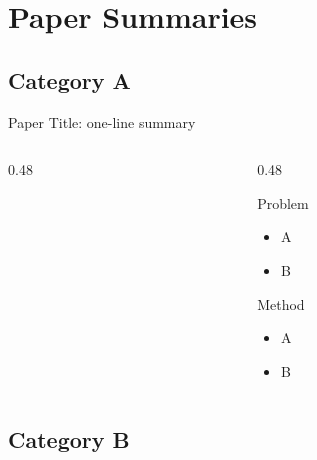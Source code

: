 \section{Paper Summaries}
\subsection{Category A}

\begin{frame}{Paper Title: one-line summary}
  \begin{columns}[T]
    \begin{column}{0.48\textwidth}

      \vspace{1mm}
    \end{column}
    \begin{column}{0.48\textwidth}
      \paperbody
      \begin{block}{Problem}
        \begin{itemize}
          \item A
          \item B
        \end{itemize}
      \end{block}
      \begin{block}{Method}
        \begin{itemize}
          \item A
          \item B
        \end{itemize}
      \end{block}
    \end{column}
  \end{columns}
\end{frame}

\subsection{Category B}
